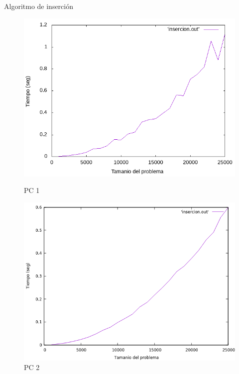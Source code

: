 \documentclass{beamer}
\begin{document}
\begin{frame}[fragile]{Algoritmo de inserción}
\begin{figure}[H]
\centering
\begin{minipage}{.5\textwidth}
  \centering
  \includegraphics[width=\linewidth]{empirica_insercion.png}
   \caption*{PC 1}
\end{minipage}%
\begin{minipage}{.5\textwidth}
  \centering
  \includegraphics[width=\linewidth]{empirica_insercion_2.png}
  \caption*{PC 2}
\end{minipage}
\end{figure}
\end{frame}
\end{document}
